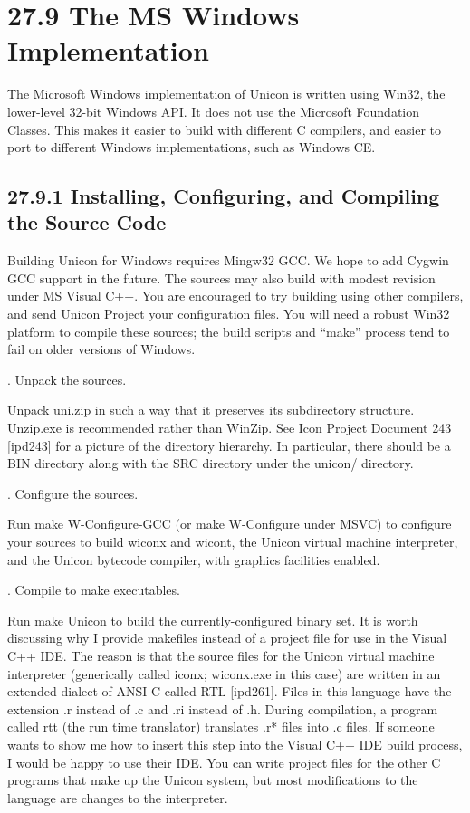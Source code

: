\section[27.9 The MS Windows Implementation]{27.9 The MS Windows Implementation}

The Microsoft Windows implementation of Unicon is written using Win32,
the lower-level 32-bit Windows API. It does not use the Microsoft
Foundation Classes. This makes it easier to build with different C
compilers, and easier to port to different Windows implementations,
such as Windows CE.

\subsection[27.9.1 Installing, Configuring, and Compiling the Source Code]{27.9.1 Installing, Configuring, and Compiling the Source Code}

Building Unicon for Windows requires Mingw32 GCC. We hope to add
Cygwin GCC support in the future. The sources may also build with
modest revision under MS Visual C++. You are encouraged to try
building using other compilers, and send Unicon Project your
configuration files. You will need a robust Win32 platform to compile
these sources; the build scripts and ``make'' process tend to fail on
older versions of Windows.

{. Unpack the sources.}

Unpack uni.zip in such a way that it preserves its subdirectory
structure. Unzip.exe is recommended rather than WinZip.  See Icon
Project Document 243 [ipd243] for a picture of the directory
hierarchy. In particular, there should be a BIN directory along with
the SRC directory under the unicon/ directory.

{. Configure the sources.}


Run {\textquotedbl}make W-Configure-GCC{\textquotedbl} (or
{\textquotedbl}make W-Configure{\textquotedbl} under MSVC) to
configure your sources to build wiconx and wicont, the Unicon virtual
machine interpreter, and the Unicon bytecode compiler, with graphics
facilities enabled.

{. Compile to make executables.}


Run {\textquotedbl}make Unicon{\textquotedbl} to build the
currently-configured binary set. It is worth discussing why I provide
makefiles instead of a project file for use in the Visual C++ IDE.
The reason is that the source files for the Unicon virtual machine
interpreter (generically called iconx; wiconx.exe in this case) are
written in an extended dialect of ANSI C called RTL [ipd261]. Files in
this language have the extension .r instead of .c and .ri instead of
.h. During compilation, a program called rtt (the run time translator)
translates .r* files into .c files. If someone wants to show me how to
insert this step into the Visual C++ IDE build process, I would be
happy to use their IDE. You can write project files for the other C
programs that make up the Unicon system, but most modifications to the
language are changes to the interpreter.


